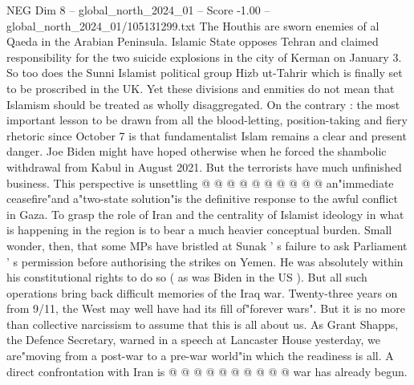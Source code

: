 \begin{textsample}{NEG Dim 8 – global\_north\_2024\_01 – Score -1.00 – global\_north\_2024\_01/105131299.txt}
The Houthis are sworn enemies of al Qaeda in the Arabian Peninsula.
Islamic State opposes Tehran and claimed responsibility for the two suicide explosions in the city of Kerman on January 3.
So too does the Sunni Islamist political group Hizb ut-Tahrir which is finally set to be proscribed in the UK.
Yet these divisions and enmities do not mean that Islamism should be treated as wholly disaggregated.
On the contrary : the most important lesson to be drawn from all the blood-letting, position-taking and fiery rhetoric since October 7 is that fundamentalist Islam remains a clear and present danger.
Joe Biden might have hoped otherwise when he forced the shambolic withdrawal from Kabul in August 2021.
But the terrorists have much unfinished business.
This perspective is unsettling @ @ @ @ @ @ @ @ @ @ an"immediate ceasefire"and a"two-state solution"is the definitive response to the awful conflict in Gaza.
To grasp the role of Iran and the centrality of Islamist ideology in what is happening in the region is to bear a much heavier conceptual burden.
Small wonder, then, that some MPs have bristled at Sunak ' s failure to ask Parliament ' s permission before authorising the strikes on Yemen.
He was absolutely within his constitutional rights to do so ( as was Biden in the US ).
But all such operations bring back difficult memories of the Iraq war.
Twenty-three years on from 9/11, the West may well have had its fill of"forever wars".
But it is no more than collective narcissism to assume that this is all about us.
As Grant Shapps, the Defence Secretary, warned in a speech at Lancaster House yesterday, we are"moving from a post-war to a pre-war world"in which the readiness is all.
A direct confrontation with Iran is @ @ @ @ @ @ @ @ @ @ war has already begun.

\end{textsample}
